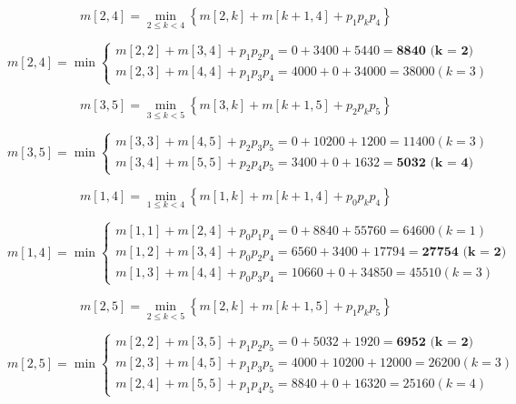 \documentclass{article}
\begin{document}
\begin{equation}
m[2, 4] = \min\limits_{2 \leq k < 4} \left\{ m[2, k] + m[k + 1, 4] + p_1p_kp_4 \right\}
\end{equation}

\begin{equation}
m[2, 4] = \min\begin{cases}
  m[2, 2] + m[3, 4] + p_1p_2p_4 = 0 + 3400 + 5440 = \textbf{8840 (k = 2)} \\
  m[2, 3] + m[4, 4] + p_1p_3p_4 = 4000 + 0 + 34000 = 38000 (k = 3)
\end{cases}
\end{equation}

\begin{equation}
m[3, 5] = \min\limits_{3 \leq k < 5} \left\{ m[3, k] + m[k + 1, 5] + p_2p_kp_5 \right\}
\end{equation}

\begin{equation}
m[3, 5] = \min\begin{cases}
  m[3, 3] + m[4, 5] + p_2p_3p_5 = 0 + 10200 + 1200 = 11400 (k = 3) \\
  m[3, 4] + m[5, 5] + p_2p_4p_5 = 3400 + 0 + 1632 = \textbf{5032 (k = 4)}
\end{cases}
\end{equation}

\begin{equation}
m[1, 4] = \min\limits_{1 \leq k < 4} \left\{ m[1, k] + m[k + 1, 4] + p_0p_kp_4 \right\}
\end{equation}

\begin{equation}
m[1, 4] = \min\begin{cases}
  m[1, 1] + m[2, 4] + p_0p_1p_4 = 0 + 8840 + 55760 = 64600 (k = 1) \\
  m[1, 2] + m[3, 4] + p_0p_2p_4 = 6560 + 3400 + 17794 = \textbf{27754 (k = 2)} \\
  m[1, 3] + m[4, 4] + p_0p_3p_4 = 10660 + 0 + 34850 = 45510 (k = 3)
\end{cases}
\end{equation}

\begin{equation}
m[2, 5] = \min\limits_{2 \leq k < 5} \left\{ m[2, k] + m[k + 1, 5] + p_1p_kp_5 \right\}
\end{equation}

\begin{equation}
m[2, 5] = \min\begin{cases}
  m[2, 2] + m[3, 5] + p_1p_2p_5 = 0 + 5032 + 1920 = \textbf{6952 (k = 2)} \\
  m[2, 3] + m[4, 5] + p_1p_3p_5 = 4000 + 10200 + 12000 = 26200 (k = 3) \\
  m[2, 4] + m[5, 5] + p_1p_4p_5 = 8840 + 0 + 16320 = 25160 (k = 4)
\end{cases}
\end{equation}
\end{document}
